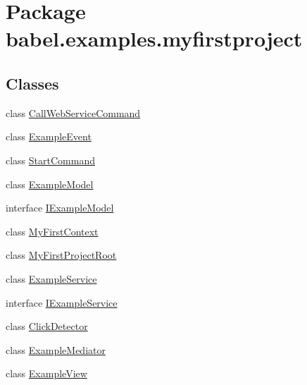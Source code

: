 \hypertarget{namespacebabel_1_1examples_1_1myfirstproject}{\section{Package babel.\-examples.\-myfirstproject}
\label{namespacebabel_1_1examples_1_1myfirstproject}
}
\subsection*{Classes}
\begin{DoxyCompactItemize}
\item 
class \hyperlink{classbabel_1_1examples_1_1myfirstproject_1_1_call_web_service_command}{Call\-Web\-Service\-Command}
\item 
class \hyperlink{classbabel_1_1examples_1_1myfirstproject_1_1_example_event}{Example\-Event}
\item 
class \hyperlink{classbabel_1_1examples_1_1myfirstproject_1_1_start_command}{Start\-Command}
\item 
class \hyperlink{classbabel_1_1examples_1_1myfirstproject_1_1_example_model}{Example\-Model}
\item 
interface \hyperlink{interfacebabel_1_1examples_1_1myfirstproject_1_1_i_example_model}{I\-Example\-Model}
\item 
class \hyperlink{classbabel_1_1examples_1_1myfirstproject_1_1_my_first_context}{My\-First\-Context}
\item 
class \hyperlink{classbabel_1_1examples_1_1myfirstproject_1_1_my_first_project_root}{My\-First\-Project\-Root}
\item 
class \hyperlink{classbabel_1_1examples_1_1myfirstproject_1_1_example_service}{Example\-Service}
\item 
interface \hyperlink{interfacebabel_1_1examples_1_1myfirstproject_1_1_i_example_service}{I\-Example\-Service}
\item 
class \hyperlink{classbabel_1_1examples_1_1myfirstproject_1_1_click_detector}{Click\-Detector}
\item 
class \hyperlink{classbabel_1_1examples_1_1myfirstproject_1_1_example_mediator}{Example\-Mediator}
\item 
class \hyperlink{classbabel_1_1examples_1_1myfirstproject_1_1_example_view}{Example\-View}
\end{DoxyCompactItemize}

